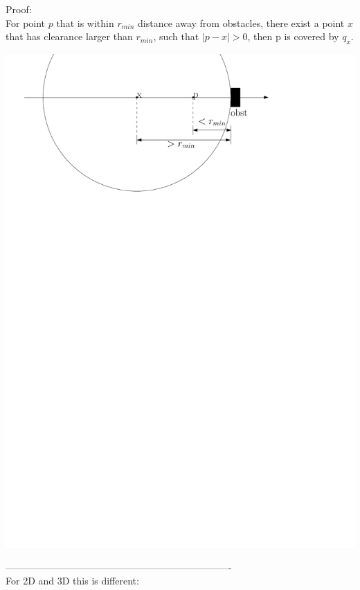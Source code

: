 \documentclass[12pt]{article}
\begin{document}
  Proof:\\
  
  For point $p$ that is within $r_{min}$ distance away from obstacles, there exist a point $x$ that has clearance larger than $r_{min}$, such that $|p-x| > 0$, then p is covered by $q_{x}$.

  \includegraphics[scale=0.8]{sample_1_2}  
  
  ---------------------------------------------------------------------- \\
  
  For 2D and 3D this is different:\\
  
\end{document}
